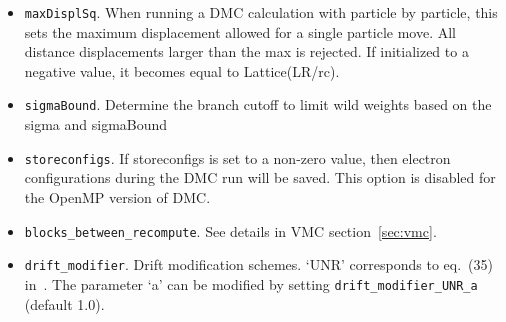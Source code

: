 \begin{itemize}
\item \texttt{maxDisplSq}.  When running a DMC calculation with particle by particle, this sets the maximum displacement allowed for a single particle move.  All distance displacements larger than the max is rejected.  If initialized to a negative value, it becomes equal to Lattice(LR/rc).

\item \texttt{sigmaBound}.  Determine the branch cutoff to limit wild weights based on the sigma and sigmaBound


\item \texttt{storeconfigs}. If storeconfigs is set to a non-zero value, then electron configurations during the DMC run will be saved. This option is disabled for the OpenMP version of DMC.

\item \texttt{blocks\_between\_recompute}. See details in VMC section~\ref{sec:vmc}.

\item \texttt{drift\_modifier}. Drift modification schemes. `UNR' corresponds to eq.~(35) in~\cite{Umrigar1993}. The parameter `a' can be modified by setting \texttt{drift\_modifier\_UNR\_a} (default 1.0).









\end{itemize}
